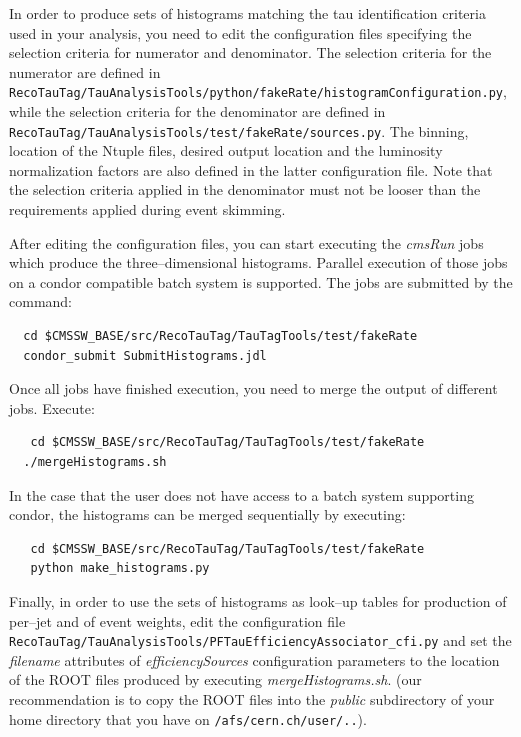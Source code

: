 In order to produce sets of histograms matching the tau identification criteria used in your analysis,
you need to edit the configuration files specifying the selection criteria for numerator and denominator.
The  selection criteria for the numerator are defined in \newline
\verb|RecoTauTag/TauAnalysisTools/python/fakeRate/histogramConfiguration.py|,
while the  selection criteria for the denominator are defined in \newline
\verb|RecoTauTag/TauAnalysisTools/test/fakeRate/sources.py|.
The binning, location of the Ntuple files, desired output location and the luminosity normalization
factors are also defined in the latter configuration file.
Note that the selection criteria applied in the denominator must not be looser than the requirements 
applied during event skimming.

After editing the configuration files, you can start executing the {\it cmsRun} jobs 
which produce the three--dimensional histograms.
Parallel execution of those jobs on a condor compatible batch system is supported.
The jobs are submitted by the command:
\begin{small}
\begin{verbatim} 
  cd $CMSSW_BASE/src/RecoTauTag/TauTagTools/test/fakeRate 
  condor_submit SubmitHistograms.jdl 
\end{verbatim}
\end{small}
Once all jobs have finished execution, you need to merge the output of different jobs.
Execute:
\begin{small}
\begin{verbatim}
   cd $CMSSW_BASE/src/RecoTauTag/TauTagTools/test/fakeRate 
  ./mergeHistograms.sh
\end{verbatim}
\end{small}

In the case that the user does not have access to a batch system supporting
condor, the histograms can be merged sequentially by executing:
\begin{small}
\begin{verbatim}
   cd $CMSSW_BASE/src/RecoTauTag/TauTagTools/test/fakeRate 
   python make_histograms.py
\end{verbatim}
\end{small}

Finally, in order to use the sets of histograms as look--up tables 
for production of per--jet and of event weights,
edit the configuration file \newline
\verb|RecoTauTag/TauAnalysisTools/PFTauEfficiencyAssociator_cfi.py|
and set the {\it filename} attributes of {\it efficiencySources} configuration parameters
to the location of the ROOT files produced by executing {\it mergeHistograms.sh}.
(our recommendation is to copy the ROOT files into the {\it public} subdirectory
 of your home directory that you have on \verb|/afs/cern.ch/user/..|).


